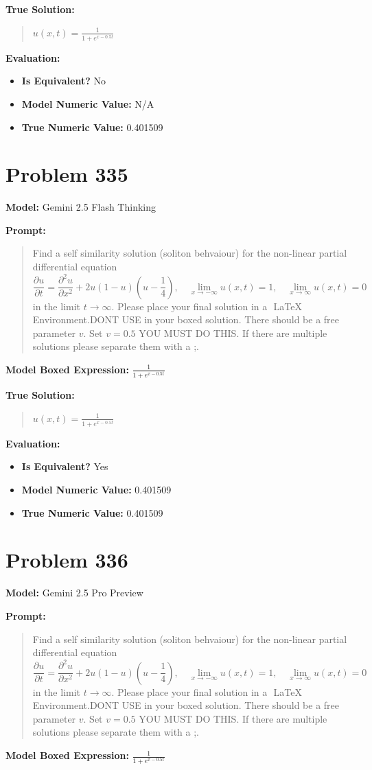 \documentclass{article}
\begin{document}
{\textbf{True Solution:}
\begin{quote}
$u(x, t) = \frac{1}{1 + e^{x - 0.5t}}$
\end{quote}

\textbf{Evaluation:}
\begin{itemize}
\item \textbf{Is Equivalent?} No
\item \textbf{Model Numeric Value:} N/A
\item \textbf{True Numeric Value:} 0.401509
\end{itemize}
\vspace{1cm}
\section*{Problem 335}
\textbf{Model:} Gemini 2.5 Flash Thinking

\textbf{Prompt:}
\begin{quote}
Find a self similarity solution (soliton behvaiour) for the non-linear partial differential equation $$ \frac{\partial u}{\partial t} = \frac{\partial^2 u}{\partial x^2} + 2 u(1-u)(u-\frac{1}{4}), \quad \lim_{x \to -\infty} u(x,t) = 1, \quad \lim_{x \to \infty} u(x,t) = 0 $$ in the limit $t \rightarrow \infty $. Please place your final solution in a $\boxed{}$ LaTeX Environment.DONT USE \operatorname in your boxed solution. There should be a free parameter $v$. Set $v=0.5$ YOU MUST DO THIS. If there are multiple solutions please separate them with a ;.
\end{quote}
\textbf{Model Boxed Expression:} $\frac{1}{1+e^{x-0.5t}}$

\textbf{True Solution:}
\begin{quote}
$u(x, t) = \frac{1}{1 + e^{x - 0.5t}}$
\end{quote}

\textbf{Evaluation:}
\begin{itemize}
\item \textbf{Is Equivalent?} Yes
\item \textbf{Model Numeric Value:} 0.401509
\item \textbf{True Numeric Value:} 0.401509
\end{itemize}
\vspace{1cm}
\section*{Problem 336}
\textbf{Model:} Gemini 2.5 Pro Preview

\textbf{Prompt:}
\begin{quote}
Find a self similarity solution (soliton behvaiour) for the non-linear partial differential equation $$ \frac{\partial u}{\partial t} = \frac{\partial^2 u}{\partial x^2} + 2 u(1-u)(u-\frac{1}{4}), \quad \lim_{x \to -\infty} u(x,t) = 1, \quad \lim_{x \to \infty} u(x,t) = 0 $$ in the limit $t \rightarrow \infty $. Please place your final solution in a $\boxed{}$ LaTeX Environment.DONT USE \operatorname in your boxed solution. There should be a free parameter $v$. Set $v=0.5$ YOU MUST DO THIS. If there are multiple solutions please separate them with a ;.
\end{quote}
\textbf{Model Boxed Expression:} $\frac{1}{1+e^{x-0.5t}}$

}
\end{document}
